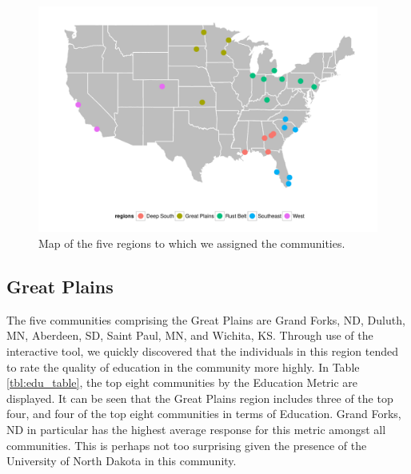 \documentclass[11pt]{article}\usepackage{knitr}
\begin{document}
\begin{knitrout}
\color{fgcolor}\begin{figure}[H]


{\centering \includegraphics[width=\textwidth]{figure/region_map} 

}

\caption[Map of the five regions to which we assigned the communities]{Map of the five regions to which we assigned the communities.\label{fig:region_map}}
\end{figure}


\end{knitrout}


\subsection{Great Plains}
The five communities comprising the Great Plains are Grand Forks, ND, Duluth, MN, Aberdeen, SD, Saint Paul, MN, and Wichita, KS. Through use of the interactive tool, we quickly discovered that the individuals in this region tended to rate the quality of education in the community more highly. In Table \ref{tbl:edu_table}, the top eight communities by the Education Metric are displayed. It can be seen that the Great Plains region includes three of the top four, and four of the top eight communities in terms of Education. Grand Forks, ND in particular has the highest average response for this metric amongst all communities. This is perhaps not too surprising given the presence of the University of North Dakota in this community.
\end{document}
